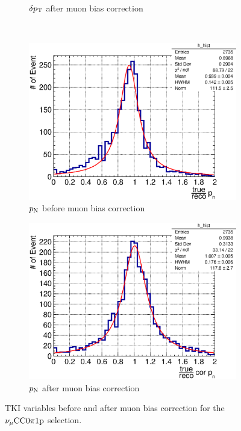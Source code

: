 \begin{figure}
\begin{subfigure}[b]{\dbfigwid\textwidth}
               \caption{$\delta p_\textrm{T}$ after muon bias correction}
               \label{subfig:esc-dpt-afmu}
          \end{subfigure}
          \\
          \begin{subfigure}[b]{\dbfigwid\textwidth}
               \centering
               \includegraphics[width=\textwidth]{figures/perf/tki/pn_rat_hist_al14.eps}
               \caption{$p_\textrm{N}$ before muon bias correction}
               \label{subfig:esc-pn-bfmu}
          \end{subfigure}
          \begin{subfigure}[b]{\dbfigwid\textwidth}
               \centering
               \includegraphics[width=\textwidth]{figures/perf/tki/cor_pn_rat_hist_al14.eps}
               \caption{$p_\textrm{N}$ after muon bias correction}
               \label{subfig:esc-pn-afmu}
          \end{subfigure}
          \caption{TKI variables before and after muon bias correction for the $\nu_{\mu}\textrm{CC}0\pi1\textrm{p}$ selection.}
          \label{fig:mc-tki-0pi-mubias}
     \end{figure}

